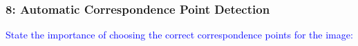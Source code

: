 \documentclass[../main.tex]{subfiles}
\begin{document}
    
    \begin{frame}
        \frametitle{8: Automatic Correspondence Point Detection}
        \selectfont\textcolor{blue}{State the importance of choosing the correct correspondence points for the image:} \\
                
        \vspace*{\fill}
    \end{frame}
\end{document}
